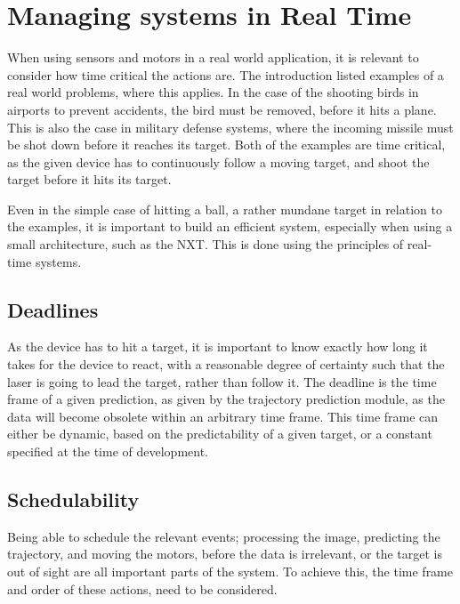 
\section{Managing systems in Real Time}
\label{sec:rts-intro}
When using sensors and motors in a real world application, it is relevant to consider how time critical the actions are.
The introduction listed examples of a real world problems, where this applies.
In the case of the shooting birds in airports to prevent accidents, the bird must be removed, before it hits a plane.
This is also the case in military defense systems, where the incoming missile must be shot down before it reaches its target. 
Both of the examples are time critical, as the given device has to continuously follow a moving target, and shoot the target before it hits its target.

Even in the simple case of hitting a ball, a rather mundane target in relation to the examples, it is important to build an efficient system, especially when using a small architecture, such as the NXT.
This is done using the principles of real-time systems.

\subsection{Deadlines}
As the device has to hit a target, it is important to know exactly how long it takes for the device to react, with a reasonable degree of certainty such that the laser is going to lead the target, rather than follow it. 
The deadline is the time frame of a given prediction, as given by the trajectory prediction module, as the data will become obsolete within an arbitrary time frame.
This time frame can either be dynamic, based on the predictability of a given target, or a constant specified at the time of development.

\subsection{Schedulability}
Being able to schedule the relevant events; processing the image, predicting the trajectory, and moving the motors, before the data is irrelevant, or the target is out of sight are all important parts of the system.
To achieve this, the time frame and order of these actions, need to be considered. 
\\\\
